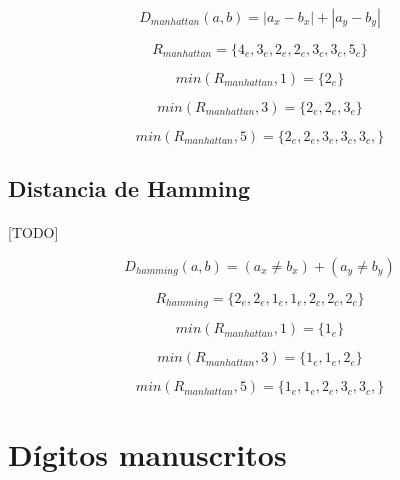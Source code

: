 \documentclass{article}
\begin{document}
			\begin{equation}
				D_{manhattan}(a,b) = |a_x - b_x| + |a_y - b_y|
			\end{equation}

			\begin{equation}
				R_{manhattan} = \{4_e, 3_e, 2_e, 2_e, 3_c, 3_c, 5_c\}
			\end{equation}

			\begin{equation}
				min(R_{manhattan},1) = \{ 2_e \}
			\end{equation}

			\begin{equation}
				min(R_{manhattan},3) = \{ 2_e, 2_e, 3_e\}
			\end{equation}

			\begin{equation}
				min(R_{manhattan},5) = \{ 2_e, 2_e, 3_e, 3_c, 3_c, \}
			\end{equation}

		\subsection{Distancia de Hamming}

			\paragraph{}
			[TODO]

			\begin{equation}
				D_{hamming}(a,b) = (a_x \neq b_x) + (a_y \neq b_y)
			\end{equation}

			\begin{equation}
				R_{hamming} = \{2_e, 2_e, 1_e, 1_e, 2_c, 2_c, 2_c\}
			\end{equation}

			\begin{equation}
				min(R_{manhattan},1) = \{ 1_e \}
			\end{equation}

			\begin{equation}
				min(R_{manhattan},3) = \{ 1_e, 1_e, 2_e\}
			\end{equation}

			\begin{equation}
				min(R_{manhattan},5) = \{ 1_e, 1_e, 2_e, 3_c, 3_c, \}
			\end{equation}

	\section{Dígitos manuscritos}
\end{document}
